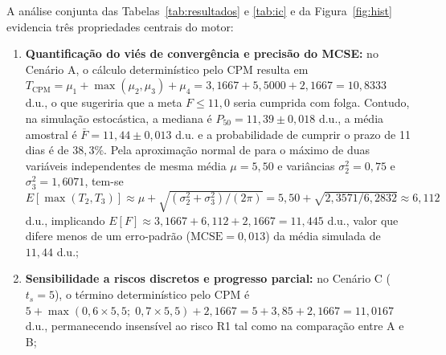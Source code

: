 \documentclass[12pt,openany,oneside,a4paper,english,brazilian,sumario=tradicional]{abntex2}
\begin{document}
A análise conjunta das Tabelas~\ref{tab:resultados} e \ref{tab:ic} e da Figura~\ref{fig:hist} evidencia três propriedades centrais do motor:
\begin{enumerate}
  \item \textbf{Quantificação do viés de convergência e precisão do MCSE:} no Cenário A, o cálculo determinístico pelo CPM resulta em $T_{\mathrm{CPM}} = \mu_1 + \max(\mu_2, \mu_3) + \mu_4 = 3{,}1667 + 5{,}5000 + 2{,}1667 = 10{,}8333$ d.u., o que sugeriria que a meta $F \le 11{,}0$ seria cumprida com folga. Contudo, na simulação estocástica, a mediana é $P_{50} = 11{,}39 \pm 0{,}018$ d.u., a média amostral é $\bar{F} = 11{,}44 \pm 0{,}013$ d.u. e a probabilidade de cumprir o prazo de 11 dias é de $38{,}3\%$. Pela aproximação normal de  para o máximo de duas variáveis independentes de mesma média $\mu=5{,}50$ e variâncias $\sigma_2^2=0{,}75$ e $\sigma_3^2=1{,}6071$, tem-se $E[\max(T_2,T_3)] \approx \mu + \sqrt{(\sigma_2^2+\sigma_3^2)/(2\pi)} = 5{,}50 + \sqrt{2{,}3571/6{,}2832} \approx 6{,}112$ d.u., implicando $E[F] \approx 3{,}1667 + 6{,}112 + 2{,}1667 = 11{,}445$ d.u., valor que difere menos de um erro-padrão ($\mathrm{MCSE}=0{,}013$) da média simulada de $11{,}44$ d.u.;
  \item \textbf{Sensibilidade a riscos discretos e progresso parcial:} no Cenário C ($t_s=5$), o término determinístico pelo CPM é $5 + \max(0{,}6\times 5{,}5;\; 0{,}7\times 5{,}5) + 2{,}1667 = 5 + 3{,}85 + 2{,}1667 = 11{,}0167$ d.u., permanecendo insensível ao risco R1 tal como na comparação entre A e B;

\end{enumerate}
\end{document}
